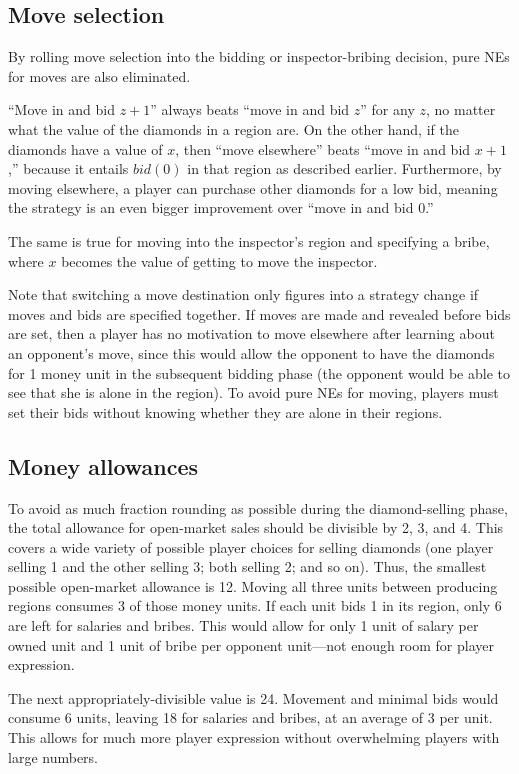 \documentclass[8pt]{extarticle}
\begin{document}
\subsection{Move selection}
By rolling move selection into the bidding or inspector-bribing decision, pure NEs for moves are also eliminated.  

``Move in and bid $z+1$'' always beats ``move in and bid $z$'' for any $z$, no matter what the value of the diamonds in a region are. On the other hand, if the diamonds have a value of $x$, then ``move elsewhere'' beats ``move in and bid $x+1$,'' because it entails $bid(0)$ in that region as described earlier.  Furthermore, by moving elsewhere, a player can purchase other diamonds for a low bid, meaning the strategy is an even bigger improvement over ``move in and bid 0.''

The same is true for moving into the inspector's region and specifying a bribe, where $x$ becomes the value of getting to move the inspector.

Note that switching a move destination only figures into a strategy change if moves and bids are specified together.  If moves are made and revealed before bids are set, then a player has no motivation to move elsewhere after learning about an opponent's move, since this would allow the opponent to have the diamonds for 1 money unit in the subsequent bidding phase (the opponent would be able to see that she is alone in the region).  To avoid pure NEs for moving, players must set their bids without knowing whether they are alone in their regions.

\subsection{Money allowances}
To avoid as much fraction rounding as possible during the diamond-selling phase, the total allowance for open-market sales should be divisible by 2, 3, and 4.  This covers a wide variety of possible player choices for selling diamonds (one player selling 1 and the other selling 3; both selling 2; and so on).  Thus, the smallest possible open-market allowance is 12.  Moving all three units between producing regions consumes 3 of those money units.  If each unit bids 1 in its region, only 6 are left for salaries and bribes.  This would allow for only 1 unit of salary per owned unit and 1 unit of bribe per opponent unit---not enough room for player expression.

The next appropriately-divisible value is 24.  Movement and minimal bids would consume 6 units, leaving 18 for salaries and bribes, at an average of 3 per unit.  This allows for much more player expression without overwhelming players with large numbers.
\end{document}
